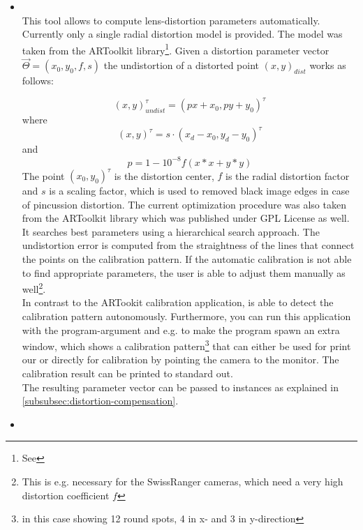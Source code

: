 \begin{itemize}
\item {}\\

This tool allows to compute lens-distortion parameters automatically. Currently only a single radial distortion model is provided. The model was taken from the ARToolkit library\footnote{See }. Given a distortion parameter vector $\vec{\Theta}=(x_0,y_0,f,s)$ the undistortion of a distorted point $(x,y)_{dist}$ works as follows:


\begin{equation}
(x,y)_{undist}^\tau = (p x + x_0, p y + y_0)^\tau
\end{equation}
%
where
%
\begin{equation}
(x,y)^\tau = s \cdot{}(x_d-x_0,y_d-y_0)^\tau
\end{equation}
%
and
%
\begin{equation}
p = 1-10^{-8}f(x*x+y*y)
\end{equation}
%
The point $(x_0,y_0)^\tau$ is the distortion center, $f$ is the radial distortion factor and $s$ is a scaling factor, which is used to removed black image edges in case of pincussion distortion. The current optimization procedure was also taken from the ARToolkit library which was published under GPL License as well. It searches best parameters using a hierarchical search approach. The undistortion error is computed from the straightness of the lines that connect the points on the calibration pattern. If the automatic calibration is not able to find appropriate parameters, the user is able to adjust them manually as well\footnote{This is e.g. necessary for the SwissRanger cameras, which need a very high distortion coefficient $f$}.\\
In contrast to the ARTookit calibration application,  is able to detect the calibration pattern autonomously. Furthermore, you can run this application with the program-argument  and e.g.  to make the program spawn an extra window, which shows a calibration pattern\footnote{in this case showing 12 round spots, 4 in x- and 3 in y-direction} that can either be used for print our or directly for calibration by pointing the camera to the monitor. The calibration result can be printed to standard out.\\
The resulting parameter vector can be passed to  instances as explained in \ref{subsubsec:distortion-compensation}.

\item {}\\
\end{itemize}









